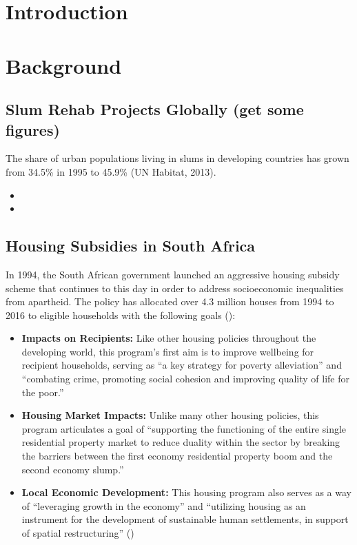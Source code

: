 \documentclass[12pt]{article}
\begin{document}
\doublespacing

\section{Introduction} \label{sec:introduction}



\section{Background} \label{sec:background}

\subsection{ Slum Rehab Projects Globally (get some figures) }

The share of urban populations living in slums in developing countries has grown from 34.5\% in 1995 to 45.9\% (UN Habitat, 2013).  


\begin{itemize}
\item 
\item 
\end{itemize}



\subsection{Housing Subsidies in South Africa}

In 1994, the South African government launched an aggressive housing subsidy scheme that continues to this day in order to address socioeconomic inequalities from apartheid.  The policy has allocated over 4.3 million houses from 1994 to 2016 to eligible households with the following goals (\cite{dhsreports}):

\begin{itemize}
	\item \textbf{Impacts on Recipients:} Like other housing policies throughout the developing world, this program's first aim is to improve wellbeing for recipient households, serving as ``a key strategy for poverty alleviation'' and ``combating crime, promoting social cohesion and improving quality of life for the poor.''
	\item \textbf{Housing Market Impacts:} Unlike many other housing policies, this program articulates a goal of ``supporting the functioning of the entire single residential property market to reduce duality within the sector by breaking the barriers between the first economy residential property boom and the second economy slump.'' 
	\item \textbf{Local Economic Development:}  This housing program also serves as a way of ``leveraging growth in the economy'' and ``utilizing housing as an instrument for the development of sustainable human settlements, in support of spatial restructuring'' (\cite{bng})
\end{itemize}
\end{document}
